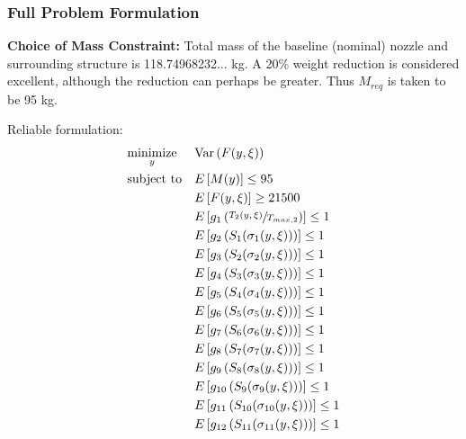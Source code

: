 \documentclass{article}
\begin{document}
\subsubsection{Full Problem Formulation}

\begin{mdframed}
\textbf{Choice of Mass Constraint:}  
Total mass of the baseline (nominal) nozzle and surrounding structure is 118.74968232... kg. A 20\% weight reduction is considered excellent, although the reduction can perhaps be greater. Thus $M_{req}$ is taken to be 95 kg.
\end{mdframed}

\begin{multicols}{2}
\centering
Reliable formulation:
\begin{equation}
\label{eq:specific_robust_optim}
\begin{aligned}
& \underset{y}{\text{minimize}}
& & \textrm{Var} \left( F(y,\xi) \right) \\
& \text{subject to}
& & E \left[ M(y) \right] \leq 95 \\
& & & E \left[ F(y,\xi) \right] \geq 21500 \\
& & & E \left[ g_1 \left( \sfrac{T_2(y,\xi)}{T_{max,2}} \right) \right] \leq 1 \\
& & & E \left[ g_2 \left( S_1 ( \sigma_1(y,\xi) ) \right) \right] \leq 1 \\
& & & E \left[ g_3 \left( S_2 ( \sigma_2(y,\xi) ) \right) \right] \leq 1 \\
& & & E \left[ g_4 \left( S_3 ( \sigma_3(y,\xi) ) \right) \right] \leq 1 \\
& & & E \left[ g_5 \left( S_4 ( \sigma_4(y,\xi) ) \right) \right] \leq 1 \\
& & & E \left[ g_6 \left( S_5 ( \sigma_5(y,\xi) ) \right) \right] \leq 1 \\
& & & E \left[ g_7 \left( S_6 ( \sigma_6(y,\xi) ) \right) \right] \leq 1 \\
& & & E \left[ g_8 \left( S_7 ( \sigma_7(y,\xi) ) \right) \right] \leq 1 \\
& & & E \left[ g_9 \left( S_8 ( \sigma_8(y,\xi) ) \right) \right] \leq 1 \\
& & & E \left[ g_{10} \left( S_9 ( \sigma_9(y,\xi) ) \right) \right] \leq 1 \\
& & & E \left[ g_{11} \left( S_{10} ( \sigma_{10}(y,\xi) ) \right) \right] \leq 1 \\
& & & E \left[ g_{12} \left( S_{11} ( \sigma_{11}(y,\xi)  ) \right) \right] \leq 1 \\

\end{aligned}
\end{equation}
\end{multicols}
\end{document}
